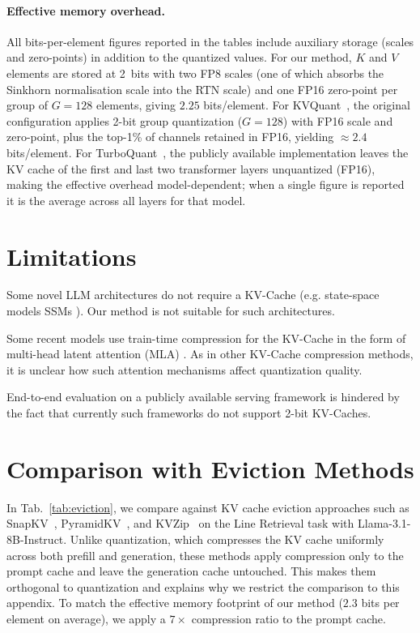 \documentclass{article}
\begin{document}
\paragraph{Effective memory overhead.}
All bits-per-element figures reported in the tables include auxiliary storage
(scales and zero-points) in addition to the quantized values. For our method, $K$ and $V$ elements are stored at 2~bits with two FP8 scales (one of which absorbs the Sinkhorn normalisation scale into the RTN scale) and
one FP16 zero-point per group of $G{=}128$ elements, giving $2.25$ bits/element.
For KVQuant~\citep{hooper2024kvquant}, the original configuration applies 2-bit
group quantization ($G{=}128$) with FP16 scale and zero-point, plus the top-1\%
of channels retained in FP16, yielding $\approx\!2.4$ bits/element.
For TurboQuant~\citep{zandieh2026turboquant}, the publicly available implementation leaves the KV cache of the first and last two transformer layers unquantized (FP16), making the effective overhead model-dependent; when a single figure is reported it is the average across all layers for that model.


\section{Limitations}
\label{sec:limitations}
Some novel LLM architectures do not require a KV-Cache (e.g. state-space models SSMs \cite{somvanshi2025s4_mamba}). Our method is not suitable for such architectures. 

Some recent models use train-time compression for the KV-Cache in the form of multi-head latent attention (MLA) \cite{liu2024deepseek}. As in other KV-Cache compression methods, it is unclear how such attention mechanisms affect quantization quality. 

End-to-end evaluation on a publicly available serving framework is hindered by the fact that currently such frameworks do not support 2-bit KV-Caches.

\section{Comparison with Eviction Methods}
\label{sec:evict}

In Tab.~\ref{tab:eviction}, we compare against KV cache eviction approaches such as SnapKV~\citep{NEURIPS2024_28ab4182_SnapKV}, PyramidKV~\citep{cai2025pyramidkv}, and KVZip~\citep{kim2026kvzip} on the Line Retrieval task with Llama-3.1-8B-Instruct. Unlike quantization, which compresses the KV cache uniformly across both prefill and generation, these methods apply compression only to the prompt cache and leave the generation cache untouched. This makes them orthogonal to quantization and explains why we restrict the comparison to this appendix. To match the effective memory footprint of our method ($2.3$ bits per element on average), we apply a $7\times$ compression ratio to the prompt cache.
\end{document}
